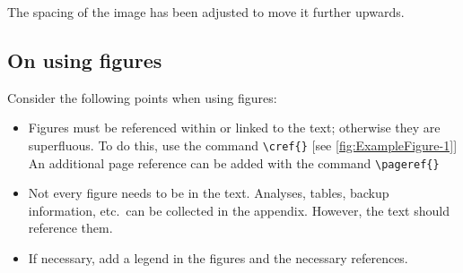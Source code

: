 The spacing of the image has been adjusted to move it further upwards.

\subsection{On using figures}
Consider the following points when using figures:
\begin{itemize}
    \item Figures must be referenced within or linked to the text; otherwise they are superfluous. To do this, use the command \verb|\cref{}|
    [see \cref{fig:ExampleFigure-1}]\\
    An additional page reference can be added with the command \verb|\pageref{}| 
    \item Not every figure needs to be in the text. Analyses, tables, backup information, etc.~can be collected in the appendix. However, the text should reference them.
    \item If necessary, add a legend in the figures and the necessary references.
\end{itemize}
